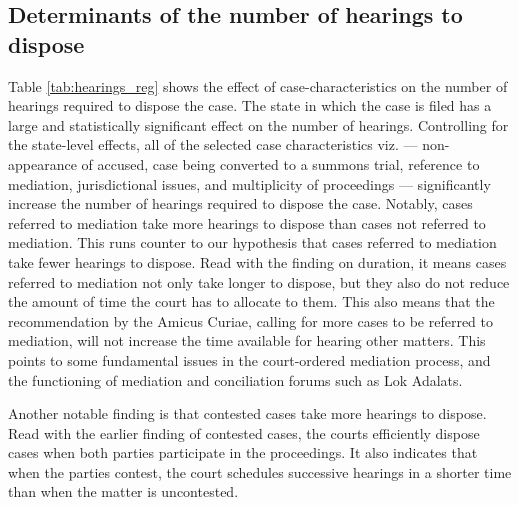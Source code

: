 \subsection{Determinants of the number of hearings to dispose}
\label{sec:determ-numb-hear}

Table \ref{tab:hearings_reg} shows the effect of case-characteristics on the number of hearings required to dispose the case. The state in which the case is filed has a large and statistically significant effect on the number of hearings. Controlling for the state-level effects, all of the selected case characteristics viz. --- non-appearance of accused, case being converted to a summons trial, reference to mediation, jurisdictional issues, and multiplicity of proceedings --- significantly increase the number of hearings required to dispose the case. Notably, cases referred to mediation take more hearings to dispose than cases not referred to mediation. This runs counter to our hypothesis that cases referred to mediation take fewer hearings to dispose. Read with the finding on duration, it means cases referred to mediation not only take longer to dispose, but they also do not reduce the amount of time the court has to allocate to them. This also means that the recommendation by the Amicus Curiae, calling for more cases to be referred to mediation, will not increase the time available for hearing other matters. This points to some fundamental issues in the court-ordered mediation process, and the functioning of mediation and conciliation forums such as Lok Adalats.

Another notable finding is that contested cases take more hearings to dispose. Read with the earlier finding of contested cases, the courts efficiently dispose cases when both parties participate in the proceedings. It also indicates that when the parties contest, the court schedules successive hearings in a shorter time than when the matter is uncontested.

